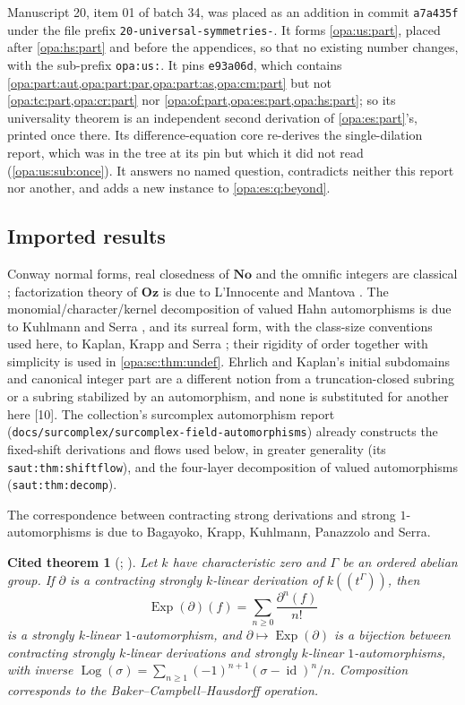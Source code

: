 \documentclass[11pt,oneside]{article}
\numberwithin{equation}{section}
\newtheorem{fact}[fact]{Cited theorem}
\theoremstyle{definition}
\theoremstyle{remark}
\newcommand{\No}{\mathbf{No}}
\newcommand{\Oz}{\mathbf{Oz}}
\newcommand{\id}{\operatorname{id}}
\newcommand{\Exp}{\operatorname{Exp}}
\newcommand{\Log}{\operatorname{Log}}
\newcommand{\Hahn}[2]{#1((t^{#2}))}
\newcommand{\src}[1]{\textup{\textsf{\small[#1]}}}
\newcommand{\lbl}[1]{\nolinkurl{#1}}
\newcommand{\fn}[1]{\nolinkurl{#1}}
\begin{document}
Manuscript 20, item 01 of batch 34, was placed as an addition in commit \texttt{a7a435f}
under the file prefix \fn{20-universal-symmetries-}. It forms \cref{opa:us:part}, placed
after \cref{opa:hs:part} and before the appendices, so that no existing number changes, with
the sub-prefix \lbl{opa:us:}. It pins \texttt{e93a06d}, which contains
\cref{opa:part:aut,opa:part:par,opa:part:as,opa:cm:part} but not \cref{opa:tc:part,opa:cr:part}
nor \cref{opa:of:part,opa:es:part,opa:hs:part}; so its universality theorem is an independent
second derivation of \cref{opa:es:part}'s, printed once there. Its difference-equation core
re-derives the single-dilation report, which was in the tree at its pin but which it did not
read (\cref{opa:us:sub:once}). It answers no named question, contradicts neither this report
nor another, and adds a new instance to \cref{opa:es:q:beyond}.

\subsection{Imported results}\label{opa:sub:imported}

Conway normal forms, real closedness of $\No$ and the omnific integers are
classical \cite{Conway,Gonshor}; factorization theory of $\Oz$ is due to
L'Innocente and Mantova \cite{LM}. The monomial/character/kernel
decomposition of valued Hahn automorphisms is due to Kuhlmann and Serra
\cite{KS}, and its surreal form, with the class-size conventions used here, to
Kaplan, Krapp and Serra \cite{KKS}; their rigidity of order together with
simplicity \cite[Proposition 5.1]{KKS} is used in \cref{opa:sc:thm:undef}.
Ehrlich and Kaplan's initial subdomains and canonical integer part \cite{EK}
are a different notion from a truncation-closed subring or a subring
stabilized by an automorphism, and none is substituted for another here
\src{10}. The collection's surcomplex automorphism
report (\fn{docs/surcomplex/surcomplex-field-automorphisms}) already
constructs the fixed-shift derivations and flows used below, in greater
generality (its \lbl{saut:thm:shiftflow}), and the four-layer decomposition
of valued automorphisms (\lbl{saut:thm:decomp}).

The correspondence between contracting strong derivations and strong
$1$-automorphisms is due to Bagayoko, Krapp, Kuhlmann, Panazzolo and Serra.

\begin{fact}[{\cite[Theorem 3.13]{BKKPS}; \cite[Fact 4.2]{KKS}}]\label{opa:fact:import}
Let $k$ have characteristic zero and $\Gamma$ be an ordered abelian group.
If $\partial$ is a contracting strongly $k$-linear derivation of
$\Hahn k\Gamma$, then
\[
 \Exp(\partial)(f)=\sum_{n\ge0}\frac{\partial^n(f)}{n!}
\]
is a strongly $k$-linear $1$-automorphism, and $\partial\mapsto\Exp(\partial)$
is a bijection between contracting strongly $k$-linear derivations and
strongly $k$-linear $1$-automorphisms, with inverse
$\Log(\sigma)=\sum_{n\ge1}(-1)^{n+1}(\sigma-\id)^n/n$. Composition
corresponds to the Baker--Campbell--Hausdorff operation.
\end{fact}
\end{document}
